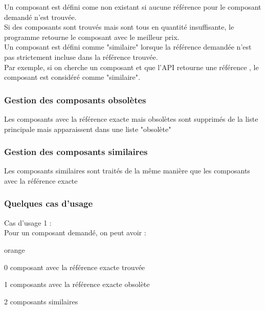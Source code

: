 Un composant est défini come non existant si aucune référence pour le composant demandé n'est trouvée.\\

Si des composants sont trouvés mais sont tous en quantité insuffisante, le programme retourne le composant avec le meilleur prix.\\

Un composant est défini comme "similaire" lorsque la référence demandée n'est pas strictement incluse dans la référence trouvée.\\
Par exemple, si on cherche un composant  et que l'API retourne une référence , le composant est considéré comme "similaire".


\subsubsection{Gestion des composants obsolètes}
Les composants avec la référence exacte mais obsolètes sont supprimés de la liste principale mais apparaissent dans une liste "obsolète"


\subsubsection{Gestion  des composants similaires}

Les composants similaires sont traités de la même manière que les composants avec la référence exacte

\subsubsection{Quelques cas d'usage}

Cas d'usage 1 : \\


Pour un composant demandé, on peut avoir : 

\begin{items}{orange}{\Bullet}
\item 0 composant avec la référence exacte trouvée
\item 1 composants avec la référence exacte obsolète
\item 2 composants similaires
\end{items}

\\

